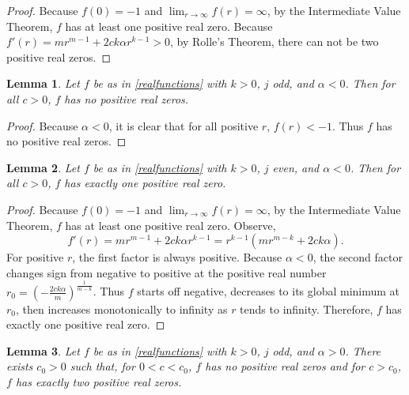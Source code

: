 \documentclass{amsart}
\newtheorem{lemma}{Lemma}
\theoremstyle{definition}
\theoremstyle{remark}
\begin{document}
\begin{proof}
    Because $f(0) = -1$ and $\lim_{r\to\infty} f(r) = \infty$, by the Intermediate Value Theorem, $f$ has at least one positive real zero. Because $f'(r) = mr^{m-1}+ 2c k\alpha  r^{k-1} > 0$, by Rolle's Theorem, there can not be two positive real zeros. 
    \end{proof}

\begin{lemma}\label{dallinlemma}
Let $f$ be as in \eqref{realfunctions} with $k>0$, $j$ odd, and $\alpha <0$. Then for all $c>0$, $f$ has no positive real zeros. 
\end{lemma}
    \begin{proof}
    Because $\alpha < 0$, it is clear that for all positive $r$, $f(r) < -1$. Thus $f$ has no positive real zeros. 
    \end{proof}

\begin{lemma}\label{marylemma}
Let $f$ be as in \eqref{realfunctions} with $k>0$, $j$ even, and $\alpha <0$. Then for all $c>0$, $f$ has exactly one positive real zero. 
\end{lemma}

    \begin{proof}
    Because $f(0) = -1$ and $\lim_{r\to\infty} f(r) = \infty$, by the Intermediate Value Theorem, $f$ has at least one positive real zero.  Observe,
    \[
    f'(r) = m r^{m-1} + 2c k \alpha r^{k-1} = r^{k-1}( m r^{m-k} +2c k \alpha).
    \]
    For positive $r$, the first factor is always positive. Because $\alpha < 0$, the second factor changes sign from negative to positive at the positive real number $r_0=\left(-\frac{2ck\alpha}{m}\right)^\frac{1}{m-k}$. Thus $f$ starts off negative, decreases to its global minimum at $r_0$, then increases monotonically to infinity as $r$ tends to infinity. Therefore, $f$ has exactly one positive real zero.   
    \end{proof}

\begin{lemma}\label{elilemma}
Let $f$ be as in \eqref{realfunctions} with $k>0$, $j$ odd, and $\alpha >0$.  There exists $c_0 > 0$ such that, for $0 < c < c_0$, $f$ has no positive real zeros and for $c > c_0$, $f$ has exactly two positive real zeros.
\end{lemma}
\end{document}

